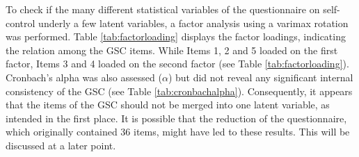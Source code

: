 To check if the many different statistical variables of the questionnaire on self-control underly a few latent variables, a factor analysis using a varimax rotation was performed. Table \ref{tab:factorloading} displays the factor loadings, indicating the relation among the GSC items. While Items 1, 2 and 5 loaded on the first factor, Items 3 and 4 loaded on the second factor (see Table \ref{tab:factorloading}). Cronbach’s alpha was also assessed ($\alpha$) but did not reveal any significant internal consistency of the GSC (see Table \ref{tab:cronbachalpha}). Consequently, it appears that the items of the GSC should not be merged into one latent variable, as intended in the first place. It is possible that the reduction of the questionnaire, which originally contained 36 items, might have led to these results. This will be discussed at a later point.\par

